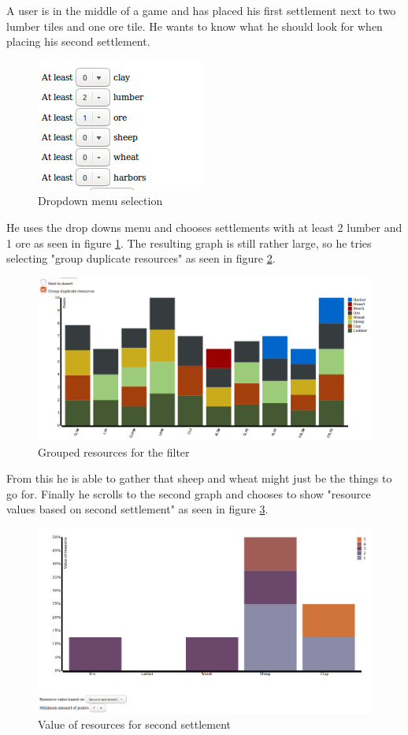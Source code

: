 \documentclass[journal]{vgtc}                %
\begin{document}
A user is in the middle of a game and has placed his first settlement next to
two lumber tiles and one ore tile. He wants to know what he should look for
when placing his second settlement.
\begin{figure}[!ht]
  \centering
  \includegraphics[scale=0.6]{scen1-1.png}
  \caption{Dropdown menu selection}
  \label{fig:s11}
\end{figure}
\noindent
He uses the drop downs menu and chooses settlements with at least 2 lumber
and 1 ore as seen in figure \ref{fig:s11}. The resulting graph is still rather
large, so he tries selecting "group duplicate resources" as seen in figure
\ref{fig:s12}.
\begin{figure}[!ht]
  \centering
  \includegraphics[width=\linewidth]{scen1-2.png}
  \caption{Grouped resources for the filter}
  \label{fig:s12}
\end{figure}
\noindent
From this he is able to gather that sheep and wheat
might just be the things to go for. Finally he scrolls to the second graph and
chooses to show "resource values based on second settlement" as seen in figure
\ref{fig:s13}.
\begin{figure}[!ht]
  \centering
  \includegraphics[width=\linewidth]{scen1-3.png}
  \caption{Value of resources for second settlement}
  \label{fig:s13}
\end{figure}
\end{document}
